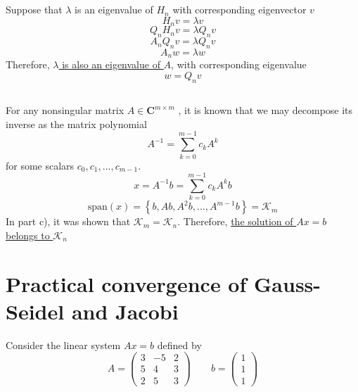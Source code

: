 \documentclass[11pt]{article} %
\begin{document}
\subsection{} %
Suppose that $\lambda$ is an eigenvalue of $H_n$ with corresponding eigenvector $v$
\begin{equation}
H_n v = \lambda v
\end{equation}
\begin{equation}
Q_n H_n v = \lambda Q_n v
\end{equation}
\begin{equation}
A_n Q_n v = \lambda Q_n v
\end{equation}
\begin{equation}
A_n w = \lambda w
\end{equation}
Therefore, \uline{$\lambda$ is also an eigenvalue of $A$}, with corresponding eigenvalue
\begin{equation}
\boxed{w = Q_n v}
\end{equation}

\subsection{} %
For any nonsingular matrix $A \in \mathbf{C}^{m \times m}$ , it is known that we may decompose its inverse as the matrix polynomial
\begin{equation}
A^{-1} = \sum_{k=0}^{m-1}c_k A^k
\end{equation}
for some scalars $c_0 , c_1 , . . . , c_{m-1}.$
\begin{equation}
x = A^{-1} b = \sum_{k=0}^{m-1}c_k A^k b
\end{equation}
\begin{equation}
\text{span} (x) = \left\{ b, Ab, A^2b, ... ,A^{m-1}b \right\} = \mathcal{K}_m
\end{equation}
In part c), it was shown that $\mathcal{K}_m = \mathcal{K}_n$. Therefore, \uline{the solution of $Ax =b$ belongs to $\mathcal{K}_n$}

\section{Practical convergence of Gauss-Seidel and Jacobi}
Consider the linear system $Ax = b$ defined by
\begin{equation}
A =\left ( \begin{array}{rrr}
3 & -5 & 2 \\
5 & 4 & 3 \\
2 & 5 & 3
\end{array} \right ) \quad \quad 
b =\left ( \begin{array}{r}
1 \\
1 \\
1 
\end{array} \right )
\label{eq:3}
\end{equation}
\end{document}
